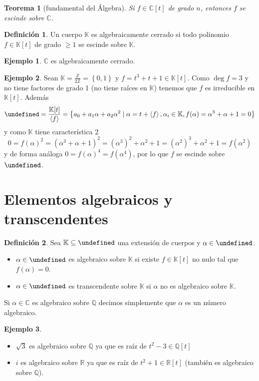 \documentclass[10pt, spanish]{report}
\newtheorem*{tma}{Teorema}
\theoremstyle{definition}
\newtheorem*{defin}{Definición}
\newtheorem*{ej}{Ejemplo}
\newcommand{\Z}{\mathbb{Z}}
\newcommand{\Q}{\mathbb{Q}}
\newcommand{\R}{\mathbb{R}}
\newcommand{\C}{\mathbb{C}}
\newcommand{\K}{\mathbb{K}}
\let\L\undefined
\newcommand{\L}{\mathbb{L}}
\renewcommand{\geq}{\geqslant}
\newcommand{\fecha}[1]{\marginpar{\underline{#1}}}
\begin{document}
\begin{tma}[fundamental del Álgebra]
    Si $f\in \C[t]$ de grado $n$, entonces $f$ se escinde sobre $\C$.
\end{tma}
\begin{defin}
    Un cuerpo $\K$ es algebraicamente cerrado si todo polinomio $f\in\K[t]$ de
    grado $\geq1$ se escinde sobre $\K$.
\end{defin}
\begin{ej}
    $\C$ es algebraicamente cerrado.
\end{ej}
\begin{ej}
    Sean $\K=\frac{\Z}{2\Z}=\left\{0,1\right\}$ y $f=t^3+t+1\in\K[t]$. Como
    $\deg{f}=3$ y no tiene factores de grado 1 (no tiene raíces en $\K$) tenemos
    que $f$ es irreducible en $\K[t]$. Además
    \[\L=\frac{\K[t]}{\left< f \right> }=\left\{ a_0+a_1\alpha+a_2\alpha^2\mid
    \alpha=t+\left< f \right>,\alpha_i\in\K, f(\alpha)=\alpha^3+\alpha+1=0 \right\}\]
    y como $\K$ tiene característica 2
    \[0=f(\alpha)^2=(\alpha^3+\alpha+1)^2=(\alpha^3)^2+\alpha^2+1=(\alpha^2)^3+\alpha^2+1=f(\alpha^2)\]
    y de forma análoga $0=f(\alpha)^4=f(\alpha^4)$, por lo que $f$ se escinde
    sobre $\L$.
\end{ej}

\fecha{18/02}
\section{Elementos algebraicos y transcendentes}
\begin{defin}
    Sea $\K\subseteq\L$ una extensión de cuerpos y $\alpha\in\L$.
    \begin{itemize}
        \item $\alpha\in \L$ es algebraico sobre $\K$ si existe $f\in\K[t]$ no
            nulo tal que $f(\alpha)=0$.
        \item $\alpha\in \L$ es transcendente sobre $\K$ si $\alpha$ no es
            algebraico sobre $\K$.
    \end{itemize}
    Si $\alpha\in\C$ es algebraico sobre $\Q$ decimos simplemente que $\alpha$
    es un número algebraico.
\end{defin}

\begin{ej}\hspace{0pt}
    \begin{itemize}
        \item $\sqrt{3}$ es algebraico sobre $\Q$ ya que es raíz de $t^2-3\in\Q[t]$
        \item $i$ es algebraico sobre $\R$ ya que es raíz de $t^2+1\in \R[t]$
            (también es algebraico sobre $\Q$).
    \end{itemize}
\end{ej}
\end{document}
